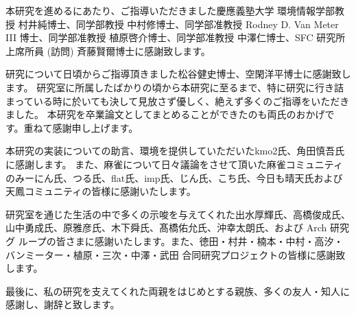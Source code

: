 \begin{acknowledgment}

本研究を進めるにあたり、ご指導いただきました慶應義塾大学 環境情報学部教授 村井純博士、同学部教授 中村修博士、同学部准教授 Rodney D. Van Meter III 博士、同学部准教授 植原啓介博士、同学部准教授 中澤仁博士、SFC 研究所 上席所員 (訪問) 斉藤賢爾博士に感謝致します。

研究について日頃からご指導頂きました松谷健史博士、空閑洋平博士に感謝致します。
研究室に所属したばかりの頃から本研究に至るまで、特に研究に行き詰まっている時に於いても決して見放さず優しく、絶えず多くのご指導をいただきました。
本研究を卒業論文としてまとめることができたのも両氏のおかげです。重ねて感謝申し上げます。

本研究の実装についての助言、環境を提供していただいたkmo2氏、角田慎吾氏に感謝します。
また、麻雀について日々議論をさせて頂いた麻雀コミュニティのみーにん氏、つる氏、flat氏、imp氏、じん氏、こち氏、今日も晴天氏および天鳳コミュニティの皆様に感謝いたします。

研究室を通じた生活の中で多くの示唆を与えてくれた出水厚輝氏、高橋俊成氏、山中勇成氏、原雅彦氏、木下舜氏、髙橋佑允氏、沖幸太朗氏、および Arch 研究グ
ループの皆さまに感謝いたします。また、徳田・村井・楠本・中村・高汐・バンミーター・植原・三次・中澤・武田 合同研究プロジェクトの皆様に感謝致します。

最後に、私の研究を支えてくれた両親をはじめとする親族、多くの友人・知人に感謝し、謝辞と致します。

\end{acknowledgment}
